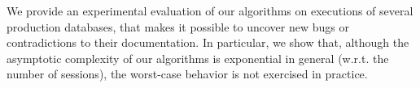 We provide an experimental evaluation of our algorithms on executions of several production databases, that makes it possible to uncover new bugs or contradictions to their documentation. 
In particular, we show that, although the asymptotic complexity of our algorithms is exponential in general (w.r.t. the number of sessions), the worst-case behavior is not exercised in practice.

%
%
%
%
